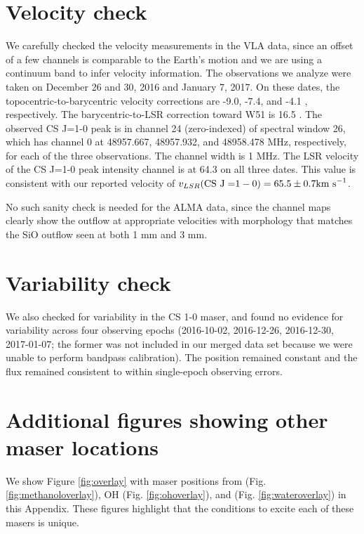 \documentclass[twocolumn]{aastex62}
\begin{document}
\appendix
\section{Velocity check}
We carefully checked the velocity measurements in the VLA data, since an offset
of a few channels is comparable to the Earth's motion and we are using a
continuum band to infer velocity information.  The observations we analyze were
taken on December 26 and 30, 2016 and January 7, 2017.  On these dates, the
topocentric-to-barycentric velocity corrections are -9.0, -7.4, and -4.1 \kms,
respectively.  The barycentric-to-LSR correction toward W51 is 16.5 \kms.  The
observed CS J=1-0 peak is in channel 24 (zero-indexed) of spectral window 26,
which has channel 0 at  48957.667, 48957.932, and 48958.478 MHz, respectively,
for each of the three observations.  The channel width is 1 MHz.  The LSR
velocity of the CS J=1-0 peak intensity channel is at 64.3 \kms on all three
dates.  This value is consistent with our reported velocity of
$v_{LSR}(\mathrm{CS~J=}1-0) = 65.5 \pm 0.7 \textrm{km~s}^{-1}$.

No such sanity check is needed for the ALMA data, since the channel maps
clearly show the outflow at appropriate velocities with morphology that matches
the SiO outflow seen at both 1 mm and 3 mm.

\section{Variability check}
We also checked for variability in the CS 1-0 maser, and found no evidence for
variability across four observing epochs (2016-10-02, 2016-12-26, 2016-12-30,
2017-01-07; the former was not included in our merged data set because we were unable
to perform bandpass calibration).  The position remained constant and the flux
remained consistent to within single-epoch observing errors.

\section{Additional figures showing other maser locations}
\label{sec:extrafigs}
We show Figure \ref{fig:overlay} with maser positions from \methanol (Fig.
\ref{fig:methanoloverlay}), OH (Fig. \ref{fig:ohoverlay}), and \water (Fig.
\ref{fig:wateroverlay}) in this Appendix.  These figures highlight that the
conditions to excite each of these masers is unique.
\end{document}

